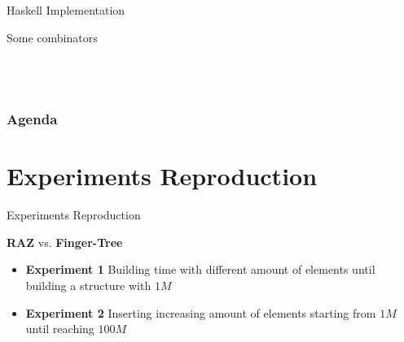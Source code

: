 \documentclass{beamer}
\begin{document}
\begin{frame}[fragile]{Haskell Implementation}

  \begin{block}{Some combinators}

\begin{listing}[H]
  \inputminted[firstline=90, lastline=91, breaklines, fontsize=\tiny]{haskell}{../src/Data/Zipper/Random.hs}
  \inputminted[firstline=104, lastline=105, breaklines, fontsize=\tiny]{haskell}{../src/Data/Zipper/Random.hs}
  \inputminted[firstline=122, lastline=129, breaklines, fontsize=\tiny]{haskell}{../src/Data/Zipper/Random.hs}
  \inputminted[firstline=132, lastline=136, breaklines, fontsize=\tiny]{haskell}{../src/Data/Zipper/Random.hs}
\end{listing}


\end{block}

\end{frame}


\begin{frame}
  \frametitle{Agenda}
  \section{Experiments Reproduction}
  \tableofcontents[currentsection]
\end{frame}

\begin{frame}[fragile]{Experiments Reproduction}

  \begin{block}{\textbf{RAZ} vs. \textbf{Finger-Tree}}
    \begin{itemize}
      \item \textbf{Experiment 1} Building time with different amount of elements until building a structure with $1M$
      \item \textbf{Experiment 2} Inserting increasing amount of elements starting from $1M$ until reaching $100M$
      \end{itemize}
  \end{block}

\end{frame}
\end{document}
